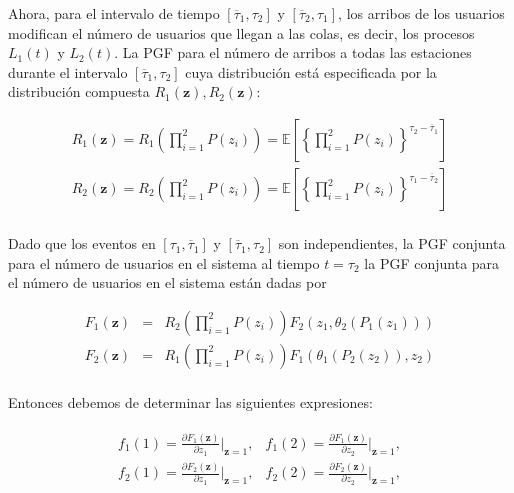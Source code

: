\documentclass{article}
\newcommand{\esp}{\mathbb{E}}
\numberwithin{equation}{section}
\begin{document}
Ahora, para el intervalo de tiempo
$\left[\overline{\tau}_{1},\tau_{2}\right]$ y $\left[\overline{\tau}_{2},\tau_{1}\right]$, los arribos de los usuarios modifican el n\'umero de usuarios que llegan a las colas, es decir, los procesos
$L_{1}\left(t\right)$ y $L_{2}\left(t\right)$. La PGF para el n\'umero de arribos a todas las estaciones durante el intervalo $\left[\overline{\tau}_{1},\tau_{2}\right]$  cuya distribuci\'on est\'a especificada por la distribuci\'on compuesta $R_{1}\left(\mathbf{z}\right),R_{2}\left(\mathbf{z}\right)$:

\begin{eqnarray*}
R_{1}\left(\mathbf{z}\right)=R_{1}\left(\prod_{i=1}^{2}P\left(z_{i}\right)\right)=\esp\left[\left\{\prod_{i=1}^{2}P\left(z_{i}\right)\right\}^{\tau_{2}-\overline{\tau}_{1}}\right]\\
R_{2}\left(\mathbf{z}\right)=R_{2}\left(\prod_{i=1}^{2}P\left(z_{i}\right)\right)=\esp\left[\left\{\prod_{i=1}^{2}P\left(z_{i}\right)\right\}^{\tau_{1}-\overline{\tau}_{2}}\right]\\
\end{eqnarray*}

Dado que los eventos en
$\left[\tau_{1},\overline{\tau}_{1}\right]$ y $\left[\overline{\tau}_{1},\tau_{2}\right]$ son independientes, la
PGF conjunta para el n\'umero de usuarios en el sistema al tiempo $t=\tau_{2}$ la PGF conjunta para el n\'umero de usuarios en el sistema est\'an dadas por

\begin{eqnarray*}
F_{1}\left(\mathbf{z}\right)&=&R_{2}\left(\prod_{i=1}^{2}P\left(z_{i}\right)\right)F_{2}\left(z_{1},\theta_{2}\left(P_{1}\left(z_{1}\right)\right)\right)\\
F_{2}\left(\mathbf{z}\right)&=&R_{1}\left(\prod_{i=1}^{2}P\left(z_{i}\right)\right)F_{1}\left(\theta_{1}\left(P_{2}\left(z_{2}\right)\right),z_{2}\right)\\
\end{eqnarray*}

Entonces debemos de determinar las siguientes expresiones:

\begin{eqnarray*}
\begin{array}{cc}
f_{1}\left(1\right)=\frac{\partial F_{1}\left(\mathbf{z}\right)}{\partial z_{1}}|_{\mathbf{z}=1}, & f_{1}\left(2\right)=\frac{\partial F_{1}\left(\mathbf{z}\right)}{\partial z_{2}}|_{\mathbf{z}=1},\\
f_{2}\left(1\right)=\frac{\partial F_{2}\left(\mathbf{z}\right)}{\partial z_{1}}|_{\mathbf{z}=1}, & f_{2}\left(2\right)=\frac{\partial F_{2}\left(\mathbf{z}\right)}{\partial z_{2}}|_{\mathbf{z}=1},\\
\end{array}
\end{eqnarray*}
\end{document}
